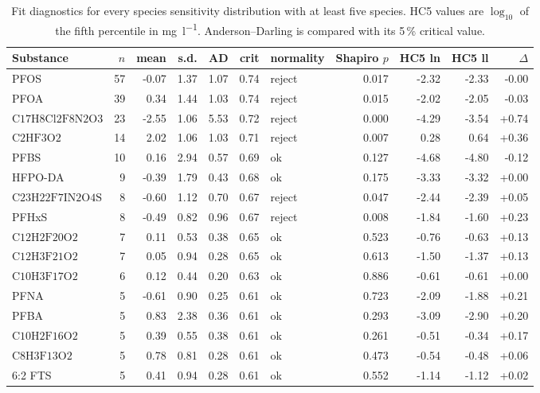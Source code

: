 \begin{table}[htbp]\centering\caption{Fit diagnostics for every species sensitivity distribution with at least five species. HC5 values are $\log_{10}$ of the fifth percentile in \si{\milli\gram\per\litre}. Anderson--Darling is compared with its 5\,\% critical value.}\label{tab:s2}\footnotesize\setlength{\tabcolsep}{3.4pt}
\begin{tabular}{@{}l r r r r r l r r r r@{}}\toprule
Substance & $n$ & mean & s.d. & AD & crit & normality & Shapiro $p$ & HC5 ln & HC5 ll & $\Delta$ \\\midrule
PFOS & 57 & -0.07 & 1.37 & 1.07 & 0.74 & reject & 0.017 & -2.32 & -2.33 & -0.00 \\
PFOA & 39 & 0.34 & 1.44 & 1.03 & 0.74 & reject & 0.015 & -2.02 & -2.05 & -0.03 \\
$\mathrm{C17H8Cl2F8N2O3}$ & 23 & -2.55 & 1.06 & 5.53 & 0.72 & reject & 0.000 & -4.29 & -3.54 & +0.74 \\
$\mathrm{C2HF3O2}$ & 14 & 2.02 & 1.06 & 1.03 & 0.71 & reject & 0.007 & 0.28 & 0.64 & +0.36 \\
PFBS & 10 & 0.16 & 2.94 & 0.57 & 0.69 & ok & 0.127 & -4.68 & -4.80 & -0.12 \\
HFPO-DA & 9 & -0.39 & 1.79 & 0.43 & 0.68 & ok & 0.175 & -3.33 & -3.32 & +0.00 \\
$\mathrm{C23H22F7IN2O4S}$ & 8 & -0.60 & 1.12 & 0.70 & 0.67 & reject & 0.047 & -2.44 & -2.39 & +0.05 \\
PFHxS & 8 & -0.49 & 0.82 & 0.96 & 0.67 & reject & 0.008 & -1.84 & -1.60 & +0.23 \\
$\mathrm{C12H2F20O2}$ & 7 & 0.11 & 0.53 & 0.38 & 0.65 & ok & 0.523 & -0.76 & -0.63 & +0.13 \\
$\mathrm{C12H3F21O2}$ & 7 & 0.05 & 0.94 & 0.28 & 0.65 & ok & 0.613 & -1.50 & -1.37 & +0.13 \\
$\mathrm{C10H3F17O2}$ & 6 & 0.12 & 0.44 & 0.20 & 0.63 & ok & 0.886 & -0.61 & -0.61 & +0.00 \\
PFNA & 5 & -0.61 & 0.90 & 0.25 & 0.61 & ok & 0.723 & -2.09 & -1.88 & +0.21 \\
PFBA & 5 & 0.83 & 2.38 & 0.36 & 0.61 & ok & 0.293 & -3.09 & -2.90 & +0.20 \\
$\mathrm{C10H2F16O2}$ & 5 & 0.39 & 0.55 & 0.38 & 0.61 & ok & 0.261 & -0.51 & -0.34 & +0.17 \\
$\mathrm{C8H3F13O2}$ & 5 & 0.78 & 0.81 & 0.28 & 0.61 & ok & 0.473 & -0.54 & -0.48 & +0.06 \\
6:2 FTS & 5 & 0.41 & 0.94 & 0.28 & 0.61 & ok & 0.552 & -1.14 & -1.12 & +0.02 \\
\bottomrule\end{tabular}\end{table}
